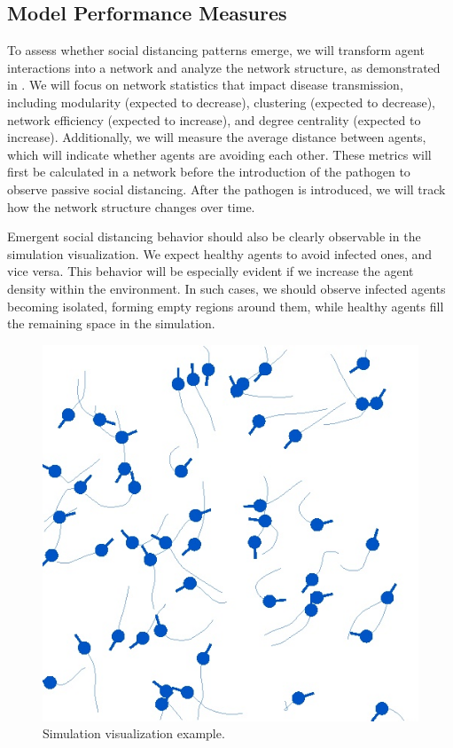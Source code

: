 \documentclass[9pt]{IEEEtran}
\begin{document}
\subsection{Model Performance Measures}

To assess whether social distancing patterns emerge, we will transform agent interactions into a network and analyze the network structure, as demonstrated in \cite{Stroeymeyt2018}. We will focus on network statistics that impact disease transmission, including modularity (expected to decrease), clustering (expected to decrease), network efficiency (expected to increase), and degree centrality (expected to increase). Additionally, we will measure the average distance between agents, which will indicate whether agents are avoiding each other. These metrics will first be calculated in a network before the introduction of the pathogen to observe passive social distancing. After the pathogen is introduced, we will track how the network structure changes over time.

Emergent social distancing behavior should also be clearly observable in the simulation visualization. We expect healthy agents to avoid infected ones, and vice versa. This behavior will be especially evident if we increase the agent density within the environment. In such cases, we should observe infected agents becoming isolated, forming empty regions around them, while healthy agents fill the remaining space in the simulation.

\begin{figure}[hbt]
    \centering
    \includegraphics[width=0.75\linewidth]{figures/env_test_img.jpg}
    \caption{Simulation visualization example.}
    \label{fig:env_example}
\end{figure}
\end{document}
